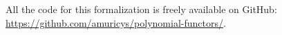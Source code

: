 All the code for this formalization is freely available on GitHub: \href{https://github.com/amuricys/polynomial-functors/}{https://github.com/amuricys/polynomial-functors/}.










